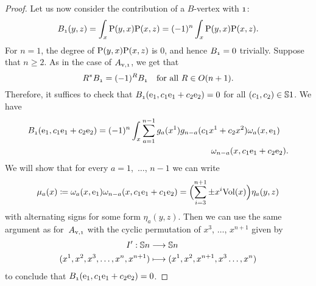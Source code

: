 \documentclass[\MainFolder/Text.tex]{subfiles}
\begin{document}
\begin{proof}
Let us now consider the contribution of a $B$-vertex with $\NOne$:
\[ B_{\NOne}(y,z) = \int_{x} \Prpg(y,x) \Prpg(x,z) = (-1)^n \int_x \Prpg(y,x) \Prpg(x,z). \]
For $n=1$, the degree of $\mathrm{P}(y,x)\mathrm{P}(x,z)$ is $0$, and hence $B_{\NOne}= 0$ trivially.
Suppose that $n\ge 2$.
As in the case of $A_{\NVol,\NOne}$, we get that 
\[ R^* B_{\NOne} = (-1)^R B_{\NOne} \quad\text{for all }R\in O(n+1). \]
Therefore, it suffices to check that $B_{\NOne}(\StdBasis_1, c_1 \StdBasis_1 + c_2 \StdBasis_2) = 0$ for all $(c_1,c_2)\in \mathbb{S}{1}$.
We have
\[  B_{\NOne}(\StdBasis_1, c_1 \StdBasis_1 + c_2 \StdBasis_2) = \begin{multlined}[t] (-1)^n \int_x \sum_{a=1}^{n-1} g_a(x^1) g_{n-a}(c_1 x^1 + c_2 x^2)\omega_a(x,\StdBasis_1) \\ \omega_{n-a}(x,c_1 \StdBasis_1 + c_2 \StdBasis_2).\end{multlined}\]
We will show that for every $a=1$,~$\dotsc$, $n-1$ we can write
\begin{equation} \label{Eq:Mu}
\mu_a(x) \coloneqq \omega_a(x,\mathrm{e}_1) \omega_{n-a}(x,c_1 \mathrm{e}_1 + c_1 \mathrm{e}_2) = \Bigl(\sum_{i=3}^{n+1} \pm  x^i \mathrm{Vol}(x)\Bigr) \eta_a(y,z)
\end{equation}
with alternating signs for some form $\eta_a(y,z)$.
Then we can use the same argument as for~$A_{\NVol,\NOne}$ with the cyclic permutation of $x^3$, $\dotsc$, $x^{n+1}$ given by
\begin{align*} 
I':\mathbb{S}{n} &\longrightarrow \mathbb{S}{n} \\
   (x^1, x^2, x^3,\dotsc, x^n, x^{n+1}) &\longmapsto (x^1, x^2, x^{n+1}, x^3 \dotsc, x^{n}) 
\end{align*}
to conclude that $B_{\NOne}(\StdBasis_1, c_1 \StdBasis_1 + c_2 \StdBasis_2) = 0$.


\end{proof}
\end{document}

